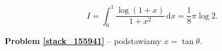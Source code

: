 %

\begin{problem_with_solution}[pytanie 155941]
    \label{stack_155941}%
    \begin{equation}
        I = \int_0^1 \frac{\log (1+x)}{1 + x^2} \,\mathrm{d}x = \frac 1 8 \pi \log 2.
    \end{equation}
\end{problem_with_solution}

\textbf{Problem \ref{stack_155941}} -- podstawiamy $x = \tan \theta$.

%